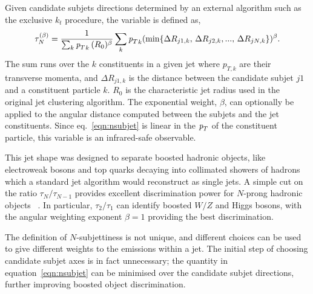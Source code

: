 Given candidate subjets directions determined by an external algorithm such as the exclusive $k_t$ procedure, the variable is defined as,
%
\begin{equation} 
\tau^{(\beta)}_N = \frac{1}{\sum_k {{\emph{p}_{T}}}_k\,(R_0)^{\beta}} \sum_k {{\emph{p}_{T}}}_k (\min \{ \Delta R_{j1,k},\,\Delta R_{j2,k},...,\,\Delta R_{jN,k} \})^{\beta}.
\label{eqn:nsubjet}
\end{equation} 
%
The sum runs over the $k$ constituents in a given jet where $p_{T,k}$ are their transverse momenta, and $\Delta R_{j1,k}$ is the distance between the candidate subjet $j1$ and a constituent particle $k$.  $R_0$ is the characteristic jet radius used in the original jet clustering algorithm.  The exponential weight, $\beta$, can optionally be applied to the angular distance computed between the subjets and the jet constituents.   
Since eq.~\ref{eqn:nsubjet} is linear in the ${\emph{p}_{T}}$ of the constituent particle, this variable is an infrared-safe observable.


This jet shape was designed to separate boosted hadronic objects, like electroweak bosons and top quarks decaying into collimated showers of hadrons which a standard jet algorithm would reconstruct as single jets. %
A simple cut on the ratio $\tau_N/\tau_{N-1}$ provides excellent discrimination power for $N$-prong hadronic objects~\cite{nsubjettiness} . In particular, $\tau_2/\tau_1$ can identify boosted $W/Z$ and Higgs bosons, with the angular weighting exponent $\beta =1$ providing the best discrimination.

The definition of $N$-subjettiness is not unique, and different choices can be used to give different weights to the emissions within a jet. The initial step of choosing candidate subjet axes is in fact unnecessary; the quantity in equation~\ref{eqn:nsubjet} can be minimised over the candidate subjet directions, further improving boosted object discrimination.

